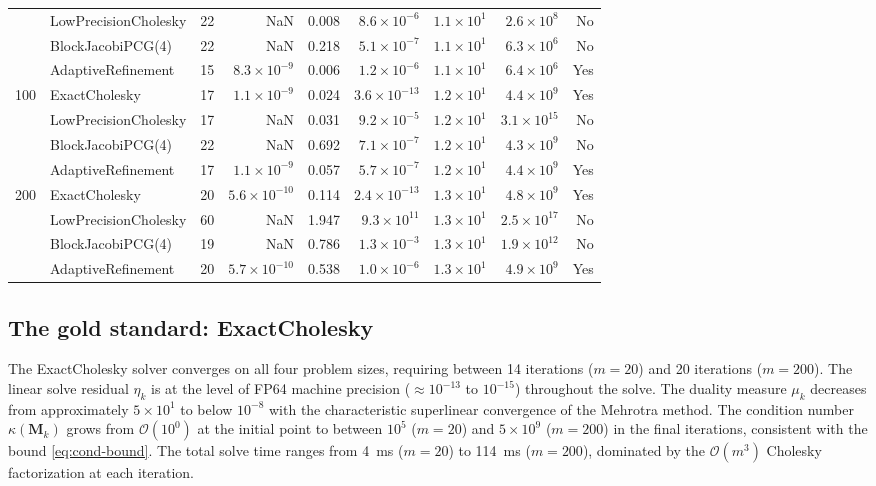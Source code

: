 \documentclass[11pt,twoside]{article}
\newcommand{\bM}{\mathbf{M}}
\newcommand{\cO}{\mathcal{O}}
\begin{document}
\begin{table}[p]
\begin{tabular}{@{}llrrrrrrr@{}}
      & LowPrecisionCholesky & 22 & NaN                  & 0.008 & $8.6\times 10^{-6}$  & $1.1\times 10^1$  & $2.6\times 10^8$   & No  \\
      & BlockJacobiPCG(4)    & 22 & NaN                  & 0.218 & $5.1\times 10^{-7}$  & $1.1\times 10^1$  & $6.3\times 10^6$   & No  \\
      & AdaptiveRefinement   & 15 & $8.3\times 10^{-9}$  & 0.006 & $1.2\times 10^{-6}$  & $1.1\times 10^1$  & $6.4\times 10^6$   & Yes \\
    \cmidrule{1-9}
    \multirow{4}{*}{100}
      & ExactCholesky        & 17 & $1.1\times 10^{-9}$  & 0.024 & $3.6\times 10^{-13}$ & $1.2\times 10^1$  & $4.4\times 10^9$   & Yes \\
      & LowPrecisionCholesky & 17 & NaN                  & 0.031 & $9.2\times 10^{-5}$  & $1.2\times 10^1$  & $3.1\times 10^{15}$& No  \\
      & BlockJacobiPCG(4)    & 22 & NaN                  & 0.692 & $7.1\times 10^{-7}$  & $1.2\times 10^1$  & $4.3\times 10^9$   & No  \\
      & AdaptiveRefinement   & 17 & $1.1\times 10^{-9}$  & 0.057 & $5.7\times 10^{-7}$  & $1.2\times 10^1$  & $4.4\times 10^9$   & Yes \\
    \cmidrule{1-9}
    \multirow{4}{*}{200}
      & ExactCholesky        & 20 & $5.6\times 10^{-10}$ & 0.114 & $2.4\times 10^{-13}$ & $1.3\times 10^1$  & $4.8\times 10^9$   & Yes \\
      & LowPrecisionCholesky & 60 & NaN                  & 1.947 & $9.3\times 10^{11}$  & $1.3\times 10^1$  & $2.5\times 10^{17}$& No  \\
      & BlockJacobiPCG(4)    & 19 & NaN                  & 0.786 & $1.3\times 10^{-3}$  & $1.3\times 10^1$  & $1.9\times 10^{12}$& No  \\
      & AdaptiveRefinement   & 20 & $5.7\times 10^{-10}$ & 0.538 & $1.0\times 10^{-6}$  & $1.3\times 10^1$  & $4.9\times 10^9$   & Yes \\
    \bottomrule
  \end{tabular}
\end{table}

\subsection{The gold standard: ExactCholesky}

The ExactCholesky solver converges on all four problem sizes, requiring
between 14 iterations ($m=20$) and 20 iterations ($m=200$).  The linear
solve residual $\eta_k$ is at the level of FP64 machine precision
($\approx 10^{-13}$ to $10^{-15}$) throughout the solve.  The duality
measure $\mu_k$ decreases from approximately $5\times 10^1$ to below
$10^{-8}$ with the characteristic superlinear convergence of the
Mehrotra method.  The condition number $\kappa(\bM_k)$ grows from
$\cO(10^0)$ at the initial point to between $10^5$ ($m=20$) and $5\times
10^9$ ($m=200$) in the final iterations, consistent with the bound
\eqref{eq:cond-bound}.  The total solve time ranges from 4~ms ($m=20$)
to 114~ms ($m=200$), dominated by the $\cO(m^3)$ Cholesky factorization
at each iteration.
\end{document}
